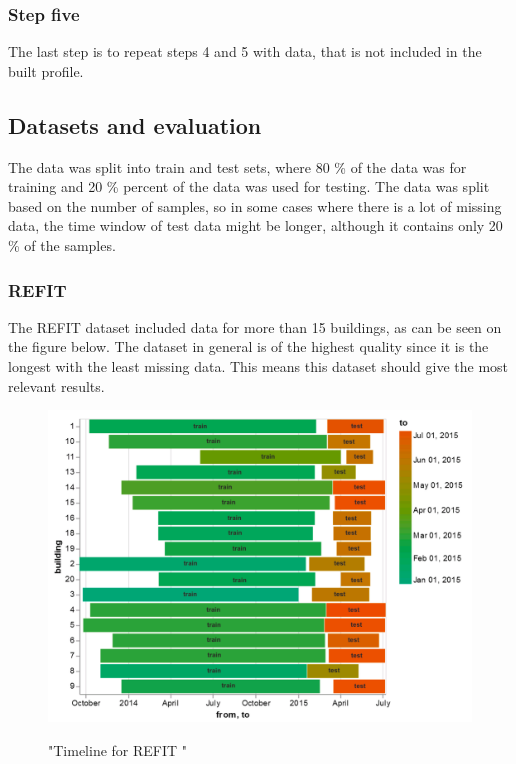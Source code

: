 \subsubsection{Step five}

The last step is to repeat steps 4 and 5 with data, that is not included in the built profile.

\subsection{Datasets and evaluation} \label{ssec:ds_eval}

The data was split into train and test sets, where 80 \% of the data was for training and 20 \% percent of the data was used for testing.
The data was split based on the number of samples, so in some cases where there is a lot of missing data, the time window of test data might be longer, although it contains only 20 \% of the samples.

\subsubsection{REFIT}
The REFIT \cite{REFIT} dataset included data for more than 15 buildings, as can be seen on the figure below.
The dataset in general is of the highest quality since it is the longest with the least missing data.
This means this dataset should give the most relevant results.
\begin{figure}[H]
	\centering
	\caption{"Timeline for REFIT "}
	\includegraphics[width=1\textwidth]{Figures/EC/refit_timeline.png}
	\label{fig:refit_timeline}
\end{figure}

